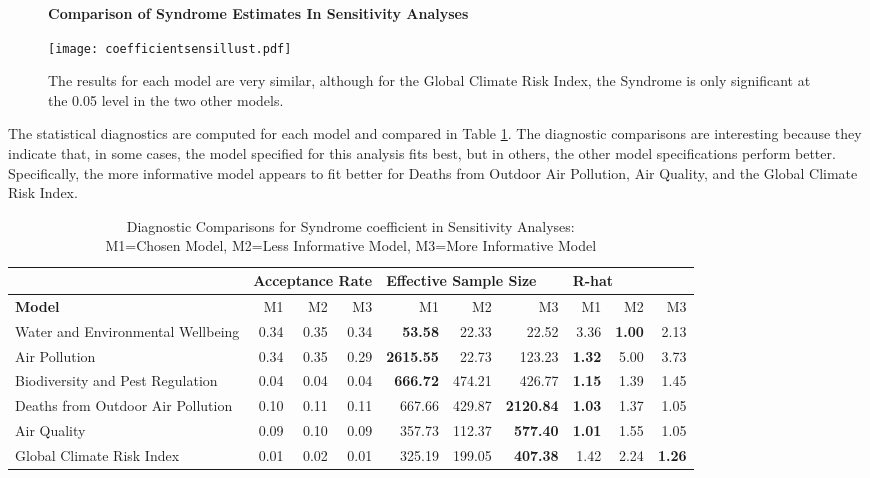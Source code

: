 \documentclass[letterpaper,10.5pt]{article}
\begin{document}
\begin{figure}
\centering
\textbf{Comparison of Syndrome Estimates In Sensitivity Analyses}\par\medskip
\centering
  \texttt{[image: coefficientsensillust.pdf]}
  \caption{The results for each model are very similar, although for the Global Climate Risk Index, the Syndrome is only significant at the 0.05 level in the two other models.}
  \label{SynCoefEstSens}
\end{figure}

The statistical diagnostics are computed for each model and compared in Table \ref{diagSynSens}. The diagnostic comparisons are interesting because they indicate that, in some cases, the model specified for this analysis fits best, but in others, the other model specifications perform better. Specifically, the more informative model appears to fit better for Deaths from Outdoor Air Pollution, Air Quality, and the Global Climate Risk Index. 

\begin{table}[htb]
       \footnotesize
    \centering
        \caption{Diagnostic Comparisons for Syndrome coefficient in Sensitivity Analyses:\\ \small{ M1=Chosen Model, M2=Less Informative Model, M3=More Informative Model}}
    \begin{tabular}{l||r|r|r||r|r|r||r|r|r}
      & \multicolumn{3}{l}{\textbf{Acceptance Rate}} & \multicolumn{3}{l}{\textbf{Effective Sample Size}} & \multicolumn{3}{l}{\textbf{R-hat}} \\
     \hline
     \textbf{Model} & M1 & M2 & M3 & M1 & M2 & M3 & M1 & M2 & M3 \\
    \hline
    Water and Environmental Wellbeing & 0.34 & 0.35 & 0.34
    & \bf{53.58}  & 22.33 & 22.52
    & 3.36  & \bf{1.00} & 2.13 \\
    Air Pollution  & 0.34  & 0.35 & 0.29
    & \bf{2615.55}  & 22.73 & 123.23
    & \bf{1.32}  & 5.00 & 3.73 \\
    Biodiversity and Pest Regulation  & 0.04 & 0.04 &  0.04
    & \bf{666.72}  & 474.21 & 426.77
    & \bf{1.15}  & 1.39 & 1.45 \\
    Deaths from Outdoor Air Pollution  & 0.10  & 0.11 & 0.11
    & 667.66  & 429.87 & \bf{2120.84}
    & \bf{1.03}  & 1.37 & 1.05 \\
    Air Quality & 0.09  & 0.10 & 0.09
    & 357.73  & 112.37 & \bf{577.40}
    & \bf{1.01}  & 1.55 & 1.05 \\
    Global Climate Risk Index  & 0.01  & 0.02 & 0.01
    & 325.19  & 199.05 & \bf{407.38}
    & 1.42  & 2.24 & \bf{1.26} \\
    \end{tabular}
    \label{diagSynSens}
\end{table}
\end{document}
